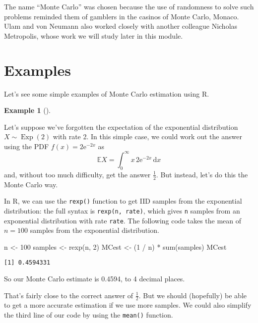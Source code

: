 \documentclass[
  letterpaper,
  DIV=11,
  numbers=noendperiod]{scrreprt}
\newenvironment{Shaded}{\begin{snugshade}}{\end{snugshade}}
\newcommand{\DecValTok}[1]{\textcolor[rgb]{0.68,0.00,0.00}{#1}}
\newcommand{\FunctionTok}[1]{\textcolor[rgb]{0.28,0.35,0.67}{#1}}
\newcommand{\NormalTok}[1]{\textcolor[rgb]{0.00,0.23,0.31}{#1}}
\newcommand{\OtherTok}[1]{\textcolor[rgb]{0.00,0.23,0.31}{#1}}
\newcommand{\SpecialCharTok}[1]{\textcolor[rgb]{0.37,0.37,0.37}{#1}}
\theoremstyle{plain}
\theoremstyle{definition}
\theoremstyle{definition}
\newtheorem{example}{Example}[chapter]
\theoremstyle{remark}
\begin{document}
The name ``Monte Carlo'' was chosen because the use of randomness to
solve such problems reminded them of gamblers in the casinos of Monte
Carlo, Monaco. Ulam and von Neumann also worked closely with another
colleague Nicholas Metropolis, whose work we will study later in this
module.

\section{Examples}\label{examples}

Let's see some simple examples of Monte Carlo estimation using R.

\begin{example}[]\protect\hypertarget{exm-MCexp}{}\label{exm-MCexp}

Let's suppose we've forgotten the expectation of the exponential
distribution \(X \sim \operatorname{Exp}(2)\) with rate 2. In this
simple case, we could work out the answer using the PDF
\(f(x) = 2\mathrm{e}^{-2x}\) as\\
\[ \mathbb E X = \int_0^\infty x\,2\mathrm{e}^{-2x}\,\mathrm{d}x \]and,
without too much difficulty, get the answer \(\frac12\). But instead,
let's do this the Monte Carlo way.

In R, we can use the \texttt{rexp()} function to get IID samples from
the exponential distribution: the full syntax is
\texttt{rexp(n,\ rate)}, which gives \texttt{n} samples from an
exponential distribution with rate \texttt{rate}. The following code
takes the mean of \(n = 100\) samples from the exponential distribution.

\begin{Shaded}
\begin{Highlighting}[]
\NormalTok{n }\OtherTok{\textless{}{-}} \DecValTok{100}
\NormalTok{samples }\OtherTok{\textless{}{-}} \FunctionTok{rexp}\NormalTok{(n, }\DecValTok{2}\NormalTok{)}
\NormalTok{MCest }\OtherTok{\textless{}{-}}\NormalTok{ (}\DecValTok{1} \SpecialCharTok{/}\NormalTok{ n) }\SpecialCharTok{*} \FunctionTok{sum}\NormalTok{(samples)}
\NormalTok{MCest}
\end{Highlighting}
\end{Shaded}

\begin{verbatim}
[1] 0.4594331
\end{verbatim}

So our Monte Carlo estimate is 0.4594, to 4 decimal places.

That's fairly close to the correct answer of \(\frac12\). But we should
(hopefully) be able to get a more accurate estimation if we use more
samples. We could also simplify the third line of our code by using the
\texttt{mean()} function.


\end{example}
\end{document}
